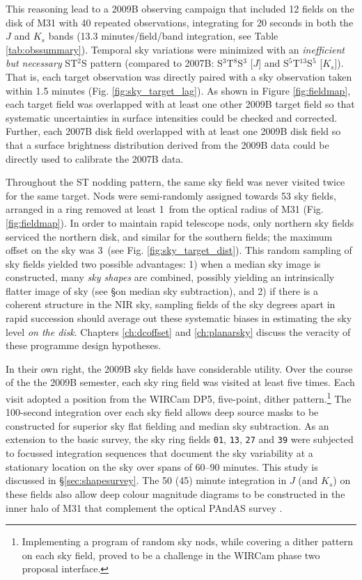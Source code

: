 \documentclass[iop]{emulateapj}
\begin{document}
This reasoning lead to a 2009B observing campaign that included 12 fields on the disk of M31 with 40 repeated observations, integrating for 20 seconds in both the $J$ and $K_s$ bands (13.3 minutes/field/band integration, see Table \ref{tab:obssummary}). Temporal sky variations were minimized with an \emph{inefficient but necessary} ST$^2$S pattern (compared to 2007B: S$^3$T$^8$S$^3$ [$J$] and S$^5$T$^{13}$S$^5$ [$K_s$]). That is, each target observation was directly paired with a sky observation taken within 1.5 minutes (Fig. \ref{fig:sky_target_lag}). As shown in Figure \ref{fig:fieldmap}, each target field was overlapped with at least one other 2009B target field so that systematic uncertainties in surface intensities could be checked and corrected. Further, each 2007B disk field overlapped with at least one 2009B disk field so that a surface brightness distribution derived from the 2009B data could be directly used to calibrate the 2007B data.

Throughout the ST nodding pattern, the same sky field was never visited twice for the same target. Nods were semi-randomly assigned towards 53 sky fields, arranged in a ring removed at least 1\arcdeg\ from the optical radius of M31 (Fig. \ref{fig:fieldmap}). In order to maintain rapid telescope nods, only northern sky fields serviced the northern disk, and similar for the southern fields; the maximum offset on the sky was 3\arcdeg\ (see Fig. \ref{fig:sky_target_dist}). This random sampling of sky fields yielded two possible advantages: 1) when a median sky image is constructed, many \emph{sky shapes} are combined, possibly yielding an intrinsically flatter image of sky (see \S on median sky subtraction), and 2) if there is a coherent structure in the NIR sky, sampling fields of the sky degrees apart in rapid succession should average out these systematic biases in estimating the sky level \emph{on the disk}. Chapters \ref{ch:dcoffset} and \ref{ch:planarsky} discuss the veracity of these programme design hypotheses.

In their own right, the 2009B sky fields have considerable utility. Over the course of the the 2009B semester, each sky ring field was visited at least five times. Each visit adopted a position from the WIRCam DP5, five-point, dither pattern.\footnote{Implementing a program of random sky nods, while covering a dither pattern on each sky field, proved to be a challenge in the WIRCam phase two proposal interface.} The 100-second integration over each sky field allows deep source masks to be constructed for superior sky flat fielding and median sky subtraction. As an extension to the basic survey, the sky ring fields \texttt{01}, \texttt{13}, \texttt{27} and \texttt{39} were subjected to focussed integration sequences that document the sky variability at a stationary location on the sky over spans of 60--90 minutes. This study is discussed in \S \ref{sec:shapesurvey}. The 50 (45) minute integration in $J$ (and $K_s$) on these fields also allow deep colour magnitude diagrams to be constructed in the inner halo of M31 that complement the optical PAndAS survey \cite{Ibata:2007}.
\end{document}
